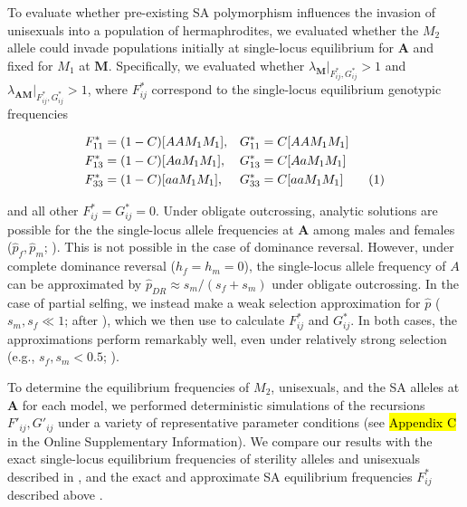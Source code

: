 \documentclass[9pt,twocolumn,twoside,lineno]{gsajnl}
\newcommand\numberthis{\addtocounter{equation}{1}\tag{\theequation}}
\begin{document}
To evaluate whether pre-existing SA polymorphism influences the invasion of unisexuals into a population of hermaphrodites, we evaluated whether the $M_2$ allele could invade populations initially at single-locus equilibrium for $\mathbf{A}$ and fixed for $M_1$ at $\mathbf{M}$. Specifically, we evaluated whether $\lambda_\mathbf{M} \rvert_{F^{\ast}_{ij},G^{\ast}_{ij}} > 1$ and $\lambda_\mathbf{AM} \rvert_{F^{\ast}_{ij},G^{\ast}_{ij}} > 1$, where $F^{\ast}_{ij}$ correspond to the single-locus equilibrium genotypic frequencies
\begin{linenomath}\begin{align*}
	F^{\ast}_{11} &= (1 - C)[AAM_1M_1],& G^{\ast}_{11} &= C[AAM_1M_1]  \\
	F^{\ast}_{13} &= (1 - C)[AaM_1M_1],& G^{\ast}_{13} &= C[AaM_1M_1] \\
	F^{\ast}_{33} &= (1 - C)[aaM_1M_1],& G^{\ast}_{33} &= C[aaM_1M_1] \numberthis \\
\end{align*}\end{linenomath}

\noindent and all other $F^{\ast}_{ij} = G^{\ast}_{ij} =0$. Under obligate outcrossing, analytic solutions are possible for the the single-locus allele frequencies at $\mathbf{A}$ among males and females ($\hat{p}_f,\hat{p}_m$; \citealt{Kidwell1977}). This is not possible in the case of dominance reversal. However, under complete dominance reversal ($h_f = h_m = 0$), the single-locus allele frequency of $A$ can be approximated by $\hat{p}_{DR} \approx s_m / (s_f + s_m)$ under obligate outcrossing. In the case of partial selfing, we instead make a weak selection approximation for $\hat{p}$ ($s_m,s_f \ll 1$; after \citealt{JordanConnallon2014}), which we then use to calculate $F^{\ast}_{ij}$ and $G^{\ast}_{ij}$. In both cases, the approximations perform remarkably well, even under relatively strong selection (e.g., $s_f,s_m < 0.5$; \citealt{ConnallonJordan2016,Olito2017}). 

To determine the equilibrium frequencies of $M_2$, unisexuals, and the SA alleles at $\mathbf{A}$ for each model, we performed deterministic simulations of the recursions $F'_{ij},G'_{ij}$ under a variety of representative parameter conditions (see \hl{Appendix C} in the Online Supplementary Information). We compare our results with the exact single-locus equilibrium frequencies of sterility alleles and unisexuals described in \citet{Charlesworth1978a}, and the exact and approximate SA equilibrium frequencies $F^{\ast}_{ij}$ described above \citep{Kidwell1977,JordanConnallon2014,ConnallonJordan2016}. 
\end{document}
